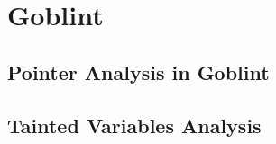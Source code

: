 \section{Goblint}

\subsection{Pointer Analysis in Goblint}

\subsection{Tainted Variables Analysis}
